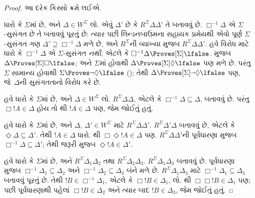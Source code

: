 \documentclass[../../../include/open-logic-section]{subfiles}
\begin{document}
\begin{proof}
  આ દરેક કિસ્સો ક્રમે લઈએ.

  ધારો કે $\Sigma$માં  છે, અને $\Delta \in W^\Sigma$ લો.
  એવું $\Delta'$ છે કે $R^\Sigma \Delta\Delta'$ તે બતાવવું છે.
  $\Box^{-1}\Delta$ એ $\Sigma$-સુસંગત છે તે બતાવવું પૂરતું છે:
  ત્યાર પછી લિન્ડનબાઉમના સહાયક પ્રમેયથી એવો પૂર્ણ
  $\Sigma$-સુસંગત ગણ $\Delta' \supseteq \Box^{-1}\Delta$ મળે છે,
  અને $R^\Sigma$ની વ્યાખ્યા
  મુજબ
  $R^\Sigma \Delta\Delta'$. હવે વિરોધ માટે ધારો કે
  $\Box^{-1}\Delta$ એ $\Sigma$-સુસંગત \emph{નથી}, એટલે કે
  $\Box^{-1}\Delta \Proves[\Sigma] \lfalse$.
   મુજબ $\Delta \Proves[\Sigma]
  \Box\lfalse$; અને $\Sigma$માં  હોવાથી
  $\Delta \Proves[\Sigma] \Diamond\lfalse$ પણ મળે છે.
  પરંતુ $\Sigma$ સામાન્ય હોવાથી $\Sigma \Proves
  \lnot\Diamond \lfalse$ ();
  તેથી $\Delta \Proves[\Sigma] \lnot\Diamond \lfalse$ પણ,
  જે~$\Delta$ની સુસંગતતાનો વિરોધ કરે છે.

  હવે ધારો કે $\Sigma$માં  છે, અને $\Delta \in W^\Sigma$
  લો. $R^\Sigma \Delta\Delta$, એટલે કે
  $\Box^{-1}\Delta \subseteq \Delta$, બતાવવું છે. પરંતુ
  $\Box!A \in \Delta$ હોય તો થી $!A \in \Delta$ પણ,
  જેમ જોઈતું હતું.

  હવે ધારો કે $\Sigma$માં  છે, અને $\Delta$,
  $\Delta' \in W^\Sigma$ માટે $R^\Sigma \Delta\Delta'$.
  $R^\Sigma \Delta'\Delta$ બતાવવું છે, એટલે કે
  $\Diamond\Delta \subseteq \Delta'$. તેથી $!A \in \Delta$
  ધારો. થી $\Box\Diamond!A \in \Delta$ પણ.
  $R^\Sigma \Delta\Delta'$ની પૂર્વધારણા
   મુજબ
  $\Box^{-1}\Delta \subseteq \Delta'$; તેથી જરૂરી મુજબ
  $\Diamond!A \in \Delta'$.

  હવે ધારો કે $\Sigma$માં  છે, અને $R^\Sigma
  \Delta_1\Delta_2$ તથા $R^\Sigma \Delta_2\Delta_3$.
  $R^\Sigma \Delta_1\Delta_3$ બતાવવું છે. પૂર્વધારણા
   મુજબ
  $\Box^{-1}\Delta_1 \subseteq \Delta_2$ અને
  $\Box^{-1}\Delta_2 \subseteq \Delta_3$ બંને મળે છે.
  $R^\Sigma \Delta_1\Delta_3$ માટે
  $\Box^{-1}\Delta_1 \subseteq \Delta_3$ બતાવવું પૂરતું છે.
  તેથી $!B \in \Box^{-1}\Delta_1$, એટલે કે
  $\Box!B \in \Delta_1$, લો. થી
  $\Box\Box!B \in \Delta_1$ પણ; પછી પૂર્વધારણાથી પહેલાં
  $\Box!B \in \Delta_2$ અને ત્યાર બાદ $!B \in \Delta_3$,
  જેમ જોઈતું હતું.


\end{proof}
\end{document}
